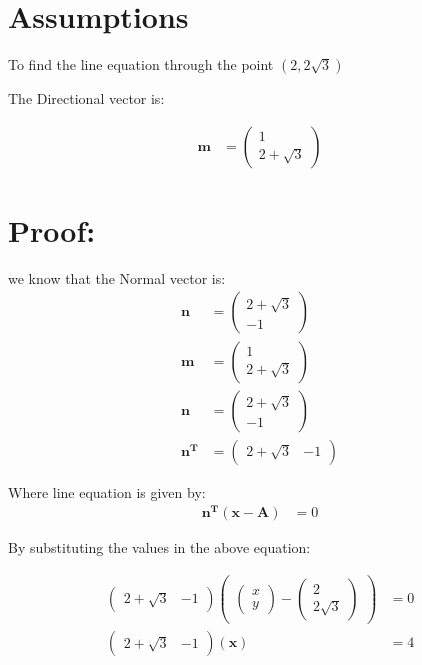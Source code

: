 \documentclass[journal,10pt,twocolumn]{article}
\let\vec\mathbf
\newcommand{\myvec}[1]{\ensuremath{\begin{pmatrix}#1\end{pmatrix}}}
\begin{document}
\section{Assumptions}
To find the line equation  through the point $(2,2\sqrt{3})$
\vspace*{3mm}

 The Directional vector is:

\begin{align}
	\vec{m}&=\myvec{1\\2+\sqrt{3}}
\end{align}
  
\section{Proof:}
we know that the Normal vector is:
\begin{align}
	\vec{n}&=\myvec{2+\sqrt{3}\\-1}\\
	\vec{m}&=\myvec{1\\2+\sqrt{3}}\\
	\vec{n}&=\myvec{2+\sqrt{3}\\-1}\\
	\vec{n^T}&=\myvec{2+\sqrt{3}&-1}	
\end{align}






Where line equation  is given by:
\begin{align}
	\vec{n^T(x-A)}&=0
\end{align}

By substituting the values in the above equation:



\begin{align}
	\myvec{2+\sqrt{3} &-1}\myvec{\myvec{x\\y}-\myvec{2\\2\sqrt{3}}}&=0\\
	\myvec{2+\sqrt{3}&-1}\vec{(x)}&=4
\end{align}
\end{document}
